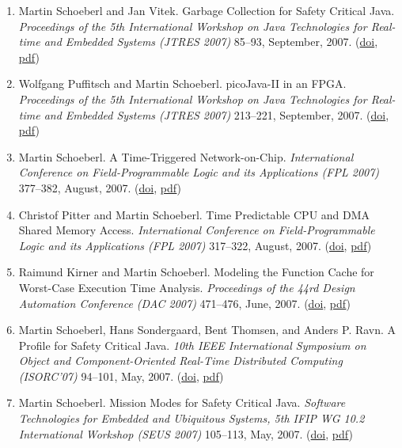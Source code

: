 \begin{enumerate}
\item Martin Schoeberl and Jan Vitek.
 Garbage Collection for Safety Critical Java.
 \emph{Proceedings of the 5th International Workshop on Java Technologies for Real-time and Embedded Systems (JTRES 2007)} 85--93, September, 2007.
(\href{http://dx.doi.org/10.1145/1288940.1288953}{doi}, \href{http://www.jopdesign.com/doc/scjgc.pdf}{pdf})

\item Wolfgang Puffitsch and Martin Schoeberl.
 picoJava-II in an FPGA.
 \emph{Proceedings of the 5th International Workshop on Java Technologies for Real-time and Embedded Systems (JTRES 2007)} 213--221, September, 2007.
(\href{http://dx.doi.org/http://doi.acm.org/10.1145/1288940.1288972}{doi}, \href{http://www.jopdesign.com/doc/pjfpga.pdf}{pdf})

\item Martin Schoeberl.
 A Time-Triggered Network-on-Chip.
 \emph{International Conference on Field-Programmable Logic and its Applications (FPL 2007)} 377--382, August, 2007.
(\href{http://dx.doi.org/10.1109/FPL.2007.4380675}{doi}, \href{http://www.jopdesign.com/doc/ttnoc_fpl2007.pdf}{pdf})

\item Christof Pitter and Martin Schoeberl.
 Time Predictable CPU and DMA Shared Memory Access.
 \emph{International Conference on Field-Programmable Logic and its Applications (FPL 2007)} 317--322, August, 2007.
(\href{http://dx.doi.org/10.1109/FPL.2007.4380666}{doi}, \href{http://www.jopdesign.com/doc/jopvga_fpl2007.pdf}{pdf})

\item Raimund Kirner and Martin Schoeberl.
 Modeling the Function Cache for Worst-Case Execution Time Analysis.
 \emph{Proceedings of the 44rd Design Automation Conference (DAC 2007)} 471--476, June, 2007.
(\href{http://dx.doi.org/10.1145/1278480.1278603}{doi}, \href{http://www.jopdesign.com/doc/cache_dac2007.pdf}{pdf})

\item Martin Schoeberl, Hans Sondergaard, Bent Thomsen, and Anders P. Ravn.
 A Profile for Safety Critical Java.
 \emph{10th IEEE International Symposium on Object and Component-Oriented Real-Time Distributed Computing (ISORC'07)} 94--101, May, 2007.
(\href{http://dx.doi.org/10.1109/ISORC.2007.9}{doi}, \href{http://www.jopdesign.com/doc/scjava_isorc2007.pdf}{pdf})

\item Martin Schoeberl.
 Mission Modes for Safety Critical Java.
 \emph{Software Technologies for Embedded and Ubiquitous Systems, 5th {IFIP} {WG} 10.2 International Workshop (SEUS 2007)} 105--113, May, 2007.
(\href{http://dx.doi.org/10.1007/978-3-540-75664-4_11}{doi}, \href{http://www.jopdesign.com/doc/scjava_modes.pdf}{pdf})



\end{enumerate}
